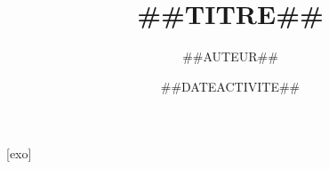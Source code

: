 \documentclass[c]{beamer}
\title{##{{TITRE}}##}
\author{##{{AUTEUR}}##}
\institute{##{{ETABLISSEMENT}}##}
\date{##{{DATEACTIVITE}}##}
\newcounter{exo}
\begin{document}
[exo]
\renewcommand{\thenocalcul}{\Alph{nocalcul}}

\begin{frame}
	\titlepage
\end{frame}
\end{document}
